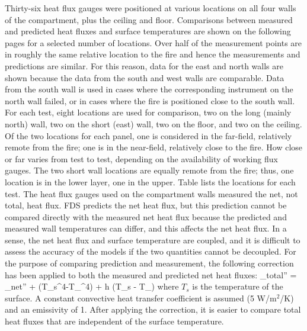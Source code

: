Thirty-six heat flux gauges were positioned at various locations on all four walls of the compartment,
plus the ceiling and floor.  Comparisons between measured and predicted heat fluxes and surface temperatures are shown
on the following pages for a selected number of locations.
Over half of the measurement points are in roughly the same relative location to the fire and hence
the measurements and predictions are similar.  For this reason, data for the east and north walls are shown
because the data from the south and west walls are comparable.  Data from the south wall is used in cases where
the corresponding instrument on the north wall failed, or in cases where the fire is positioned close to the south wall.
For each test, eight locations are used for comparison, two on the long (mainly north) wall,
two on the short (east) wall, two on the floor, and two on the ceiling.  Of the two locations for each panel,
one is considered in the far-field, relatively remote from the fire; one is in the near-field,
relatively close to the fire.  How close or far varies from test to test, depending on the availability of working flux gauges.
The two short wall locations are equally remote from the fire; thus, one location is in the lower layer, one in the upper.
Table lists the locations for each test.
The heat flux gauges used on the compartment walls measured the net, not total, heat flux.
FDS predicts the net heat flux, but this prediction cannot be compared directly with the measured net heat
flux because the predicted and measured wall temperatures can differ, and this affects the net heat flux.
In a sense, the net heat flux and surface temperature are coupled, and it is difficult to assess the accuracy of the models
if the two quantities cannot be decoupled.  For the purpose of comparing prediction and measurement,
the following correction has been applied to both the measured and predicted net heat fluxes:
\be  \dq_{\hbox{\tiny total}}'' = \dq_{\hbox{\tiny net}}'' + \sigma (T_s^4-T_\infty^4) + h (T_s - T_\infty) \ee
where $T_s$ is the temperature of the surface.  A constant convective heat transfer coefficient is assumed
(5 W/m$^2$/K) and an emissivity of 1.
After applying the correction, it is easier to compare total heat fluxes that are independent of the surface temperature.




